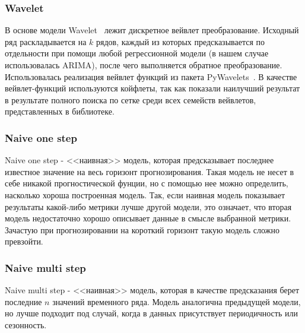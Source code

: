 \documentclass[a4paper,article,14pt]{extarticle}
\begin{document}
\subsubsection{Wavelet}
В основе модели Wavelet~\cite{wavelet} лежит дискретное вейвлет преобразование.
Исходный ряд раскладывается на $k$ рядов, каждый из которых предсказывается по отдельности при помощи любой регрессионной модели (в нашем случае использовалась ARIMA), после чего выполняется обратное преобразование.
Использовалась реализация вейвлет функций из пакета PyWavelets~\cite{pywt}.
В качестве вейвлет-функций используются койфлеты, так как показали наилучший результат в результате полного поиска по сетке среди всех семейств вейвлетов, представленных в библиотеке.

\begin{comment}
    4. %
    \subsubsection{Fourier Extrapolation}
    модель экстраполяции фурье.
    Часто используется при обработке сигналов и может быть применена для работы с финансовыми временными рядами.
\end{comment}


\subsubsection{Naive one step}
Naive one step - <<наивная>> модель, которая предсказывает последнее известное значение на весь горизонт прогнозирования.
Такая модель не несет в себе никакой прогностической фунции, но с помощью нее можно определить, насколько хороша построенная модель.
Так, если наивная модель показывает результаты какой-либо метрики лучше другой модели, это означает, что вторая модель недостаточно хорошо описывает данные в смысле выбранной метрики.
Зачастую при прогнозировании на короткий горизонт такую модель сложно превзойти. %

\subsubsection{Naive multi step}
Naive multi step - <<наивная>> модель, которая в качестве предсказания берет последние $n$ значений временного ряда.
Модель аналогична предыдущей модели, но лучше подходит под случай, когда в данных присутствует периодичность или сезонность.
\end{document}
